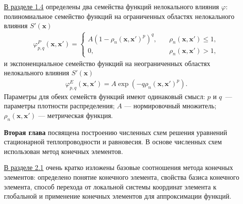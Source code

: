 \underline{В разделе 1.4} определены два семейства функций нелокального влияния $\varphi$: полиномиальное семейство функций на ограниченных областях нелокального влияния $S'(\boldsymbol{x})$
\begin{gather}
	\label{eq:Polynomial}
	\varphi_{p,q}^{P}(\boldsymbol{x}, \boldsymbol{x}') =
	\begin{cases}
		A(1 - \rho_n(\boldsymbol{x}, \boldsymbol{x}')^p)^q, \quad &\rho_n(\boldsymbol{x}, \boldsymbol{x}') \leqslant 1, \\
		0, &\rho_n(\boldsymbol{x}, \boldsymbol{x}') > 1,
	\end{cases}
\end{gather}
и экспоненциальное семейство функций на неограниченных областях нелокального влияния $S'(\boldsymbol{x})$
\begin{gather}
	\label{eq:Exponential}
	\varphi_{p,q}^{E} (\boldsymbol{x}, \boldsymbol{x}') =
	A \exp \left(-q\rho_n(\boldsymbol{x}, \boldsymbol{x}')^p \right).
\end{gather}
Параметры для обеих семейств функций имеют одинаковый смысл: $p$ и $q$~--- параметры плотности распределения; $A$ --- нормировочный множитель; $\rho_n(\boldsymbol{x}, \boldsymbol{x}')$ --- метрическая функция.

\textbf{Вторая глава} посвящена построению численных схем решения уравнений стационарной теплопроводности и равновесия. В основе численных схем использован метод конечных элементов.

\underline{В разделе 2.1} очень кратко изложены базовые соотношения метода конечных элементов: определено понятие конечного элемента, свойства базиса конечного элемента, способ перехода от локальной системы координат элемента к глобальной и применение конечных элементов для аппроксимации функций.

